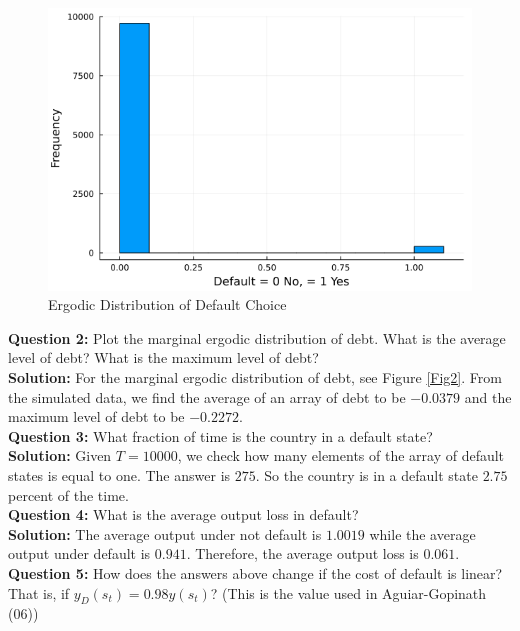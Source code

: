 \documentclass{article}
\begin{document}
	\begin{figure}[htbp]
		\centering
		\includegraphics[scale=0.5]{default_hist.png}
		\caption{Ergodic Distribution of Default Choice}
	\end{figure}
	
	\noindent\textbf{Question 2:} Plot the marginal ergodic distribution of debt. What is the average level of debt? What is the maximum level of debt? \\
	
	\noindent\textbf{Solution:} For the marginal ergodic distribution of debt, see Figure \ref{Fig2}. From the simulated data, we find the average of an array of debt to be $-0.0379$ and the maximum level of debt to be $-0.2272$. \\
	
	\noindent\textbf{Question 3:} What fraction of time is the country in a default state? \\
	
	\noindent\textbf{Solution:} Given $T = 10000$, we check how many elements of the array of default states is equal to one. The answer is $275$. So the country is in a default state $2.75$ percent of the time. \\
	
	\noindent\textbf{Question 4:} What is the average output loss in default? \\
	
	\noindent\textbf{Solution:} The average output under not default is $1.0019$ while the average output under default is $0.941$. Therefore, the average output loss is $0.061$. \\
	
	\noindent\textbf{Question 5:} How does the answers above change if the cost of default is linear? That is, if $y_{D}(s_{t}) = 0.98 y(s_{t})$? (This is the value used in Aguiar-Gopinath (06))  \\
	
\end{document}
